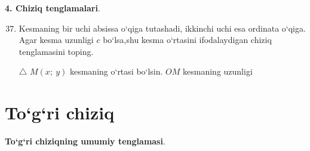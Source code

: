 \textbf{4. Chiziq tenglamalari}. 

\begin{enumerate}
	\setcounter{enumi}{36}
	\item Kesmaning bir uchi absissa o`qiga tutashadi, ikkinchi uchi esa ordinata o`qiga. Agar kesma uzunligi $c$ bo`lsa,shu kesma o`rtasini ifodalaydigan chiziq tenglamasini toping.
	
	$\triangle$ $M(x;\ y)$ kesmaning o`rtasi bo`lsin. $OM$ kesmaning uzunligi
\end{enumerate}







\section{To`g`ri chiziq}
\textbf{To`g`ri chiziqning umumiy tenglamasi}.
